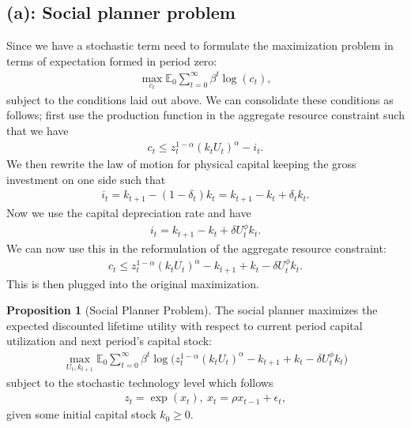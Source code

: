 \documentclass[a4paper]{article}
\theoremstyle{definition}
\newtheorem{prop}{Proposition}[section]
\begin{document}
\subsection{(a): Social planner problem}	
Since we have a stochastic term need to formulate the maximization problem in terms of expectation formed in period zero:
	\begin{align*}
	\max\limits_{c_t} \mathbb E_0 \sum\limits_{t=0}^{\infty} \beta^t \log (c_t),
	\end{align*}
subject to the conditions laid out above. We can consolidate these conditions as follows; first use the production function in the aggregate resource constraint such that we have
	\begin{align*}
	c_t \leq z_t^{1-\alpha}(k_t U_t)^\alpha - i_t.
	\end{align*}	
We then rewrite the law of motion for physical capital keeping the gross investment on one side such that
	\begin{align*}
	i_t = k_{t+1} - (1-\delta_t)k_t = k_{t+1} - k_t + \delta_t k_t .
	\end{align*}	
Now we use the capital depreciation rate and have
	\begin{align*}
	i_t = k_{t+1} - k_t + \delta U_t^\phi k_t. 
	\end{align*}	
We can now use this in the reformulation of the aggregate resource constraint:
	\begin{align*}
	c_t \leq z_t^{1-\alpha}(k_t U_t)^\alpha - k_{t+1} + k_t - \delta U_t^\phi k_t.
	\end{align*}	
This is then plugged into the original maximization.
	\begin{leftbar}
		\begin{prop}[Social Planner Problem]
		The social planner maximizes the expected discounted lifetime utility with respect to current period capital utilization and next period's capital stock:
			\begin{align}
			\max\limits_{U_t,k_{t+1}} \mathbb E_0 \sum\limits_{t=0}^{\infty} \beta^t \log \Big(  z_t^{1-\alpha}(k_t U_t)^\alpha - k_{t+1} + k_t - \delta U_t^\phi k_t \Big)
			\end{align}	
		subject to the stochastic technology level which follows
			\begin{align}
			z_t = \exp(x_t),\ x_t = \rho x_{t-1} + \epsilon_t,
			\end{align}	
		given some initial capital stock $k_0 \geq 0$. 	
		\end{prop}
	\end{leftbar}	
\end{document}
